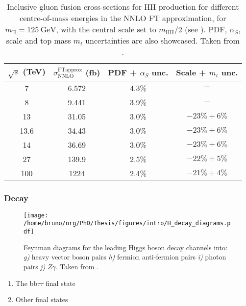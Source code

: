 \documentclass[11pt]{article}
\newcommand{\mhh}{m_{\text{HH}}}
\newcommand{\mh}{m_{\text{H}}}
\begin{document}
\begin{table}[!h]
\centering
\begin{tabular}{c|c|c|c}
\(\sqrt{s}\) (\si{\TeV}) & \(\sigma^{\text{FTapprox}}_{\text{NNLO}}\) (\si{\femto\barn}) & PDF + \(\alpha_{S}\) unc. & Scale + \(m_{t}\) unc.\\[0pt]
\hline
7 & 6.572 & \textpm{}4.3\% & \(-\)\\[0pt]
8 & 9.441 & \textpm{}3.9\% & \(-\)\\[0pt]
13 & 31.05 & \textpm{}3.0\% & \(-23\% +6\%\)\\[0pt]
13.6 & 34.43 & \textpm{}3.0\% & \(-23\% +6\%\)\\[0pt]
14 & 36.69 & \textpm{}3.0\% & \(-23\% +6\%\)\\[0pt]
27 & 139.9 & \textpm{}2.5\% & \(-22\% +5\%\)\\[0pt]
100 & 1224 & \textpm{}2.4\% & \(-21\% +4\%\)\\[0pt]
\end{tabular}
\caption{\label{tab:HH_production_xsec}Inclusive gluon fusion cross-sections for HH production for different centre-of-mass energies in the \ac{NNLO} \ac{FT} approximation, for \(\mh=\SI{125}{\GeV}\), with the central scale set to \(\mhh/2\) (see \cite{higgs_xsec_top_effects}). PDF, \(\alpha_{S}\), scale and top mass \(m_{t}\) uncertainties are also showcased. Taken from \cite{lhc_wg4_twiki}.}

\end{table}
\subsubsection{Decay}
\label{sec:org7aaa323}
\label{sec:Decay}

\begin{figure}[htbp]
\centering
\texttt{[image: /home/bruno/org/PhD/Thesis/figures/intro/H\_decay\_diagrams.pdf]}
\caption{\label{fig:HH_decay_diagrams}Feynman diagrams for the leading Higgs boson decay channels into: \emph{g)} heavy vector boson pairs \emph{h)} fermion anti-fermion pairs \emph{i)} photon pairs \emph{j)} \(Z\gamma\). Taken from \cite{higgs_10_years}.}
\end{figure}

\begin{enumerate}
\item The bb\(\tau \tau\) final state
\label{sec:orga1c4821}

\item Other final states
\label{sec:org8242931}
\end{enumerate}
\end{document}
